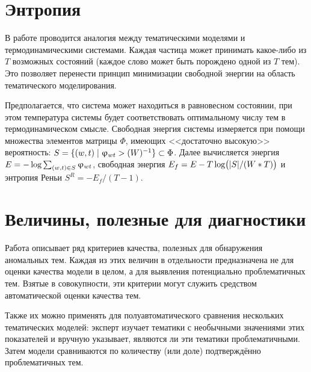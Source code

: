 \section{Энтропия}

В работе \cite{koltcov2018application} проводится аналогия между тематическими моделями и термодинамическими системами. Каждая частица может принимать какое-либо из $T$ возможных состояний (каждое слово может быть порождено одной из $T$ тем). Это позволяет перенести принцип минимизации свободной энергии на область тематического моделирования.

Предполагается, что система может находиться в равновесном состоянии, при этом температура системы будет соответствовать оптимальному числу тем в термодинамическом смысле. Свободная энергия системы измеряется при помощи множества элементов матрицы $\Phi$, имеющих <<достаточно высокую>> вероятность: $S \hm= \{(w, t) \hm\mid \phi_{wt} \hm> (W)^{-1} \} \hm\subset \Phi$. Далее вычисляется энергия $E \hm= -\log \sum_{(w,t) \in S} \phi_{wt}$, свободная энергия  $E_f \hm= E - T \log\bigl(|S| / (W * T)\bigr)$ и энтропия Реньи $S^R = -E_f / (T - 1)$.

\section{Величины, полезные для диагностики}

Работа \cite{boydcare} описывает ряд критериев качества, полезных для обнаружения аномальных тем. Каждая из этих величин в отдельности предназначена не для оценки качества модели в целом, а для выявления потенциально проблематичных тем. Взятые в совокупности, эти критерии могут служить средством автоматической оценки качества тем.

Также их можно применять для полуавтоматического сравнения нескольких тематических моделей: эксперт изучает тематики с необычными значениями этих показателей и вручную указывает, являются ли эти тематики проблематичными. Затем модели сравниваются по количеству (или доле) подтверждённо проблематичных тем.

